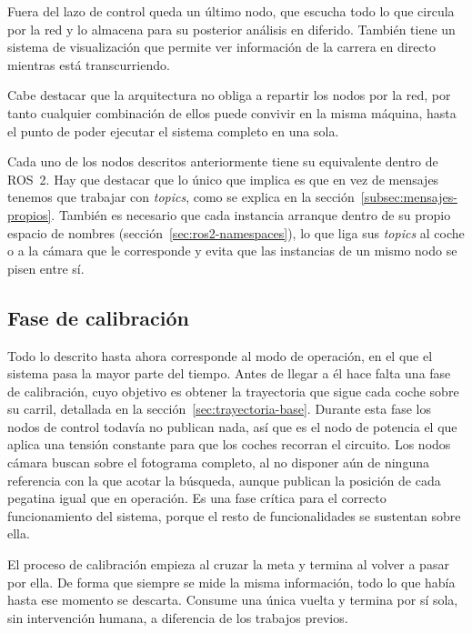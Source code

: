 Fuera del lazo de control queda un último nodo, que escucha todo lo que circula por la red y lo almacena para su posterior análisis en diferido. También tiene un sistema de visualización que permite ver información de la carrera en directo mientras está transcurriendo. 

Cabe destacar que la arquitectura no obliga a repartir los nodos por la red, por tanto cualquier combinación de ellos puede convivir en la misma máquina, hasta el punto de poder ejecutar el sistema completo en una sola.

Cada uno de los nodos descritos anteriormente tiene su equivalente dentro de ROS~2. Hay que destacar que lo único que implica es que en vez de mensajes tenemos que trabajar con \emph{topics}, como se explica en la sección~\ref{subsec:mensajes-propios}. También es necesario que cada instancia arranque dentro de su propio espacio de nombres (sección~\ref{sec:ros2-namespaces}), lo que liga sus \emph{topics} al coche o a la cámara que le corresponde y evita que las instancias de un mismo nodo se pisen entre sí.


\subsection{Fase de calibración}
\label{subsec:fase-calibracion}

Todo lo descrito hasta ahora corresponde al modo de operación, en el que el sistema pasa la mayor parte del tiempo. Antes de llegar a él hace falta una fase de calibración, cuyo objetivo es obtener la trayectoria que sigue cada coche sobre su carril, detallada en la sección~\ref{sec:trayectoria-base}. Durante esta fase los nodos de control todavía no publican nada, así que es el nodo de potencia el que aplica una tensión constante para que los coches recorran el circuito. Los nodos cámara buscan sobre el fotograma completo, al no disponer aún de ninguna referencia con la que acotar la búsqueda, aunque publican la posición de cada pegatina igual que en operación. Es una fase crítica para el correcto funcionamiento del sistema, porque el resto de funcionalidades se sustentan sobre ella.

El proceso de calibración empieza al cruzar la meta y termina al volver a pasar por ella. De forma que siempre se mide la misma información, todo lo que había hasta ese momento se descarta. Consume una única vuelta y termina por sí sola, sin intervención humana, a diferencia de los trabajos previos.

